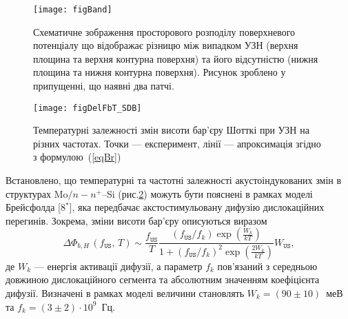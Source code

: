 \begin{figure}
\center
\texttt{[image: figBand]}
\caption{\label{figBand}
Схематичне зображення
просторового розподілу поверхневого потенціалу
що відображає різницю між випадком УЗН (верхня площина та верхня контурна поверхня) та
його відсутністю (нижня площина та нижня контурна поверхня).
Рисунок зроблено у припущенні, що наявні два патчі.
\vspace{1em}
}%
\end{figure}

\begin{figure}[b]
\center
\texttt{[image: figDelFbT\_SDB]}
\caption{\label{figDelFbT_SDB}
Температурні залежності змін висоти бар'єру Шотткі при УЗН на різних частотах.
Точки --- експеримент,
лінії --- апроксимація згідно з формулою~(\ref{eqBr})
}%
\end{figure}
Встановлено, що температурні та частотні залежності акустоіндукованих змін в структурах
 Mo$/n-n^+$--Si (рис.\ref{figDelFbT_SDB}) можуть бути пояснені в рамках моделі Брейсфолда
[8$^*$],
яка передбачає акстостимульовану дифузію дислокаційних перегинів.
Зокрема, зміни висоти бар'єру описуються виразом
\begin{equation}
\label{eqBr}
\Delta\Phi_{b,H}\,(f_\mathtt{US},\,T)\sim\frac{f_\mathtt{US}}{T}\frac{(f_\mathtt{US}/{f_k})\exp\left(\frac{W_k}{kT}\right)}
{1+(f_\mathtt{US}/{f_k})^2\exp\left(\frac{2W_k}{kT}\right)}W_\mathtt{US},
\end{equation}
де
$W_k$ --- енергія активації дифузії,
а параметр $f_k$ пов'язаний з середньою довжиною дислокаційного сегмента та абсолютним значенням коефіцієнта дифузії.
Визначені в рамках моделі величини становлять $W_k=(90\pm10)$~меВ та $f_k=(3\pm2)\cdot10^9$~Гц.


